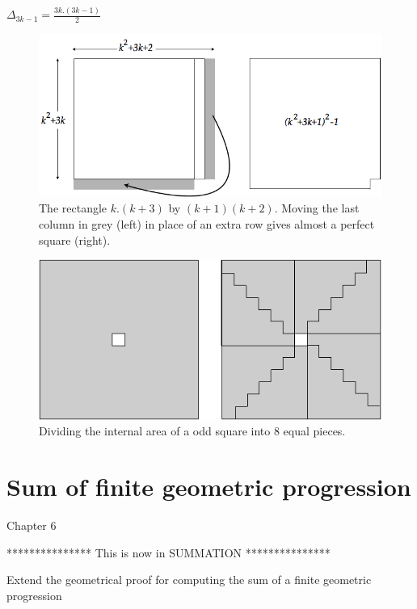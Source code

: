 \documentclass{article}[12pt]
\begin{document}
$\Delta_{3k-1} = \frac{3k.(3k-1)}{2}$
\begin{figure}[h]
\begin{center}
        \includegraphics[scale=0.5]{FiguresArithmetic/Product4consecutivePhase1} 
        \caption{The rectangle $k.(k+3)$ by $(k+1)(k+2)$. Moving the last column in grey (left) 
        in place of an extra row gives almost a perfect square (right).}
\end{center}
\end{figure}
\begin{figure}[h]
\begin{center}
        \includegraphics[scale=0.5]{FiguresArithmetic/Product4consecutivePhase2} 
        \caption{Dividing the internal area of a odd square into $8$ equal pieces.}
\end{center}
\end{figure}

\section{Sum of finite geometric progression}

Chapter 6

***************
This is now in SUMMATION
***************

Extend the geometrical proof for computing the sum of a finite geometric progression 
\end{document}
